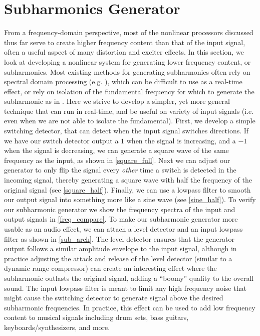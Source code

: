 \documentclass[twoside,a4paper]{article}
\begin{document}
\section{Subharmonics Generator} \label{sec:subharm}
%
From a frequency-domain perspective, most of the nonlinear processors
discussed thus far serve to create higher frequency content than that
of the input signal, often a useful aspect of many distortion and exciter
effects. In this section, we look at developing a nonlinear system for
generating lower frequency content, or subharmonics. Most existing
methods for generating subharmonics often rely on spectral domain
processing (e.g. \cite{sub_spectral}), which can be difficult to use
as a real-time effect, or rely on isolation of the fundamental frequency
for which to generate the subharmonic as in \cite{sub_sqrt}. Here we
strive to develop a simpler, yet more general technique that can run in
real-time, and be useful on  variety of input signals (i.e. even when
we are not able to isolate the fundamental).
\newline\newline
First, we develop a simple switching detector, that can detect when the
input signal switches directions. If we have our switch detector output
a $1$ when the signal is increasing, and a $-1$ when the signal is
decreasing, we can generate a square wave of the same frequency as the
input, as shown in \cref{square_full}. Next we can adjust our generator to
only flip the signal every {\it other} time a switch is detected in the
incoming signal, thereby generating a square wave with half the frequency
of the original signal (see \cref{square_half}). Finally, we can use a
lowpass filter to smooth our output signal into something more like a
sine wave (see \cref{sine_half}). To verify our subharmonic generator
we show the frequency spectra of the input and output signals in
\cref{freq_compare}.
\newline\newline
To make our subharmonic generator more usable as an audio effect, we can
attach a level detector and an input lowpass filter as shown in
\cref{sub_arch}. The level detector ensures that the generator output
follows a similar amplitude envelope to the input signal, although in
practice adjusting the attack and release of the level detector (similar
to a dynamic range compressor) can create an interesting effect where the
subharmonic outlasts the original signal, adding a ``boomy'' quality to
the overall sound. The input lowpass filter is meant to limit any high
frequency noise that might cause the switching detector to generate
signal above the desired subharmonic frequencies. In practice,
this effect can be used to add low frequency content to musical signals
including drum sets, bass guitars, keyboards/synthesizers, and more.
%
\end{document}
